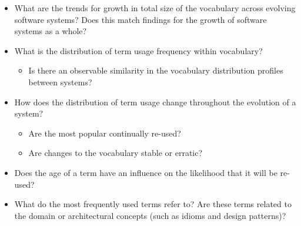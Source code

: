\begin{itemize}
	\item What are the trends for growth in total size of the vocabulary across evolving software systems? Does this match findings for the growth of software systems as a whole?
	\item What is the distribution of term usage frequency within vocabulary?
		\begin{itemize}
			\item Is there an observable similarity in the vocabulary distribution profiles between systems?
		\end{itemize}
	\item How does the distribution of term usage change throughout the evolution of a system?
		\begin{itemize}
			\item Are the most popular continually re-used?
			\item Are changes to the vocabulary stable or erratic?
		\end{itemize}
	\item Does the age of a term have an influence on the likelihood that it will be re-used?
	\item What do the most frequently used terms refer to? Are these terms related to the domain or architectural concepts (such as idioms and design patterns)?
\end{itemize}

